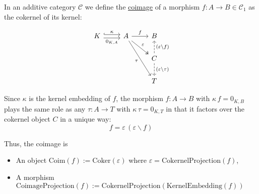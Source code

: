 \begin{definition}[Coimage]
In an additive category $\mathcal{C}$ we define the \ul{coimage} of a morphism $f : A \rightarrow B \in \mathcal{C}_{1}$ as the 
cokernel of its kernel:\\
\begin{minipage}{.06\textwidth} \phantom{} \end{minipage}
\begin{minipage}{.39\textwidth}
\[
\begin{tikzcd}[
  ampersand replacement=\&,
]
K \arrow[r, "\kappa", hook, shift left] \arrow[r, "{0_{K,A}}"', shift right] \& A \arrow[r, "f"] \arrow[rd, "\varepsilon", two heads] \arrow[rdd, "\tau"'] \& B                                                                                                   \\
                                                                             \&                                                                            \& C \arrow[u, "(\varepsilon\backslash f)"', dashed] \arrow[d, "(\varepsilon\backslash \tau)", dashed] \\
                                                                             \&                                                                            \& T                                                                                                  
\end{tikzcd}
\]
\end{minipage}
\begin{minipage}{.49\textwidth}
Since $\kappa$ is the kernel embedding of $f$, the morphism $f : A \rightarrow B$ with $\kappa\,f = 0_{K,B}$ plays the
same role as any $\tau : A \rightarrow T$ with $\kappa\,\tau = 0_{K,T}$ in that it factors over the cokernel object $C$ in a
unique way:
\[
f = \varepsilon\,(\varepsilon\backslash f)
\]
\end{minipage}
\begin{minipage}{.06\textwidth} \phantom{} \end{minipage}

Thus, the coimage is
\begin{itemize}
\item An object $\mathrm{Coim}(f) := \mathrm{Coker}(\varepsilon)$ where $\varepsilon = \mathrm{CokernelProjection}(f)$,
\item A morphism $\mathrm{CoimageProjection}(f) := \mathrm{CokernelProjection}(\mathrm{KernelEmbedding}(f))$
\end{itemize}
\end{definition}

